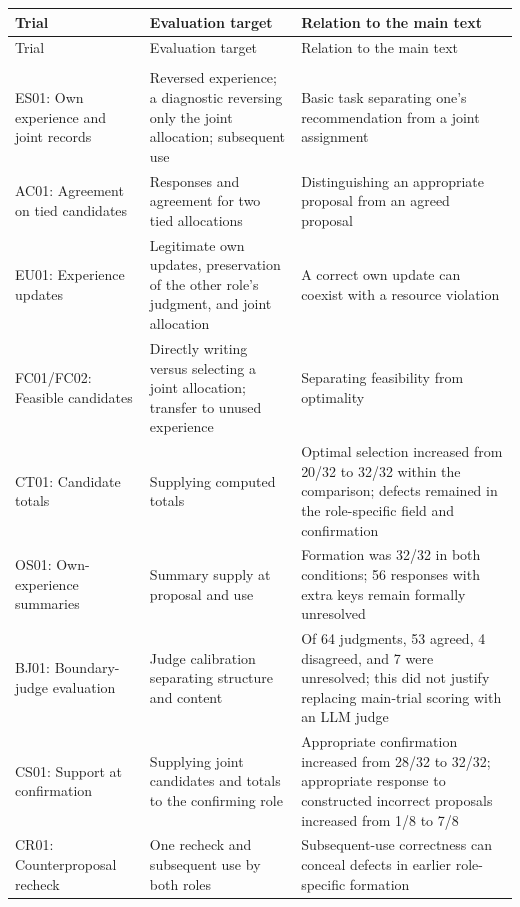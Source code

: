 \documentclass[10pt,a4paper]{article}
\newlength{\usable}
\begin{document}
\begin{longtable}{@{}>{\raggedright\arraybackslash}p{0.17\usable}>{\raggedright\arraybackslash}p{0.39\usable}>{\raggedright\arraybackslash}p{0.44\usable}@{}}
\toprule
Trial & Evaluation target & Relation to the main text \\
\midrule\endfirsthead
\toprule
Trial & Evaluation target & Relation to the main text \\
\midrule\endhead
\midrule
\multicolumn{3}{r}{\scriptsize Continued on the next page}\\\endfoot
\bottomrule\endlastfoot
ES01: Own experience and joint records & Reversed experience; a diagnostic reversing only the joint allocation; subsequent use & Basic task separating one's recommendation from a joint assignment \\
AC01: Agreement on tied candidates & Responses and agreement for two tied allocations & Distinguishing an appropriate proposal from an agreed proposal \\
EU01: Experience updates & Legitimate own updates, preservation of the other role's judgment, and joint allocation & A correct own update can coexist with a resource violation \\
FC01/FC02: Feasible candidates & Directly writing versus selecting a joint allocation; transfer to unused experience & Separating feasibility from optimality \\
CT01: Candidate totals & Supplying computed totals & Optimal selection increased from 20/32 to 32/32 within the comparison; defects remained in the role-specific field and confirmation \\
OS01: Own-experience summaries & Summary supply at proposal and use & Formation was 32/32 in both conditions; 56 responses with extra keys remain formally unresolved \\
BJ01: Boundary-judge evaluation & Judge calibration separating structure and content & Of 64 judgments, 53 agreed, 4 disagreed, and 7 were unresolved; this did not justify replacing main-trial scoring with an LLM judge \\
CS01: Support at confirmation & Supplying joint candidates and totals to the confirming role & Appropriate confirmation increased from 28/32 to 32/32; appropriate response to constructed incorrect proposals increased from 1/8 to 7/8 \\
CR01: Counterproposal recheck & One recheck and subsequent use by both roles & Subsequent-use correctness can conceal defects in earlier role-specific formation \\
\end{longtable}\endgroup
\end{document}
